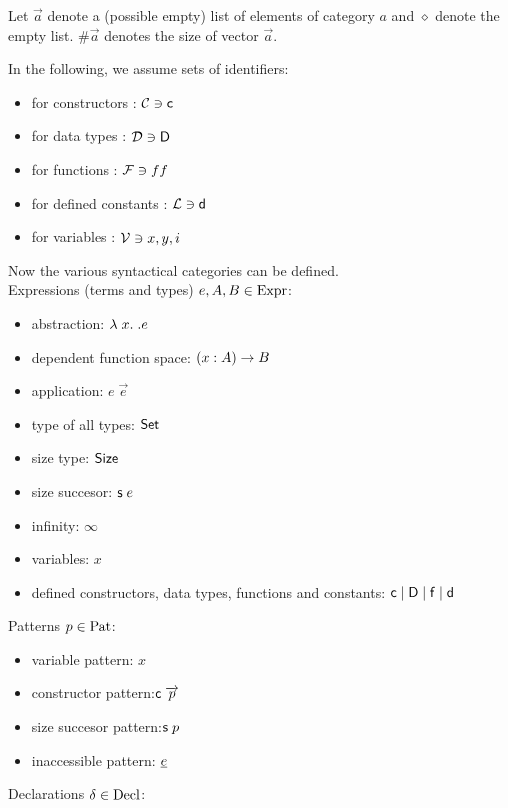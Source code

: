 Let $\vec{a}$ denote a (possible empty) list of elements of category $a$
and $\diamond$ denote the empty list. $\#\vec{a}$ denotes the size of vector $\vec{a}$.

In the following, we assume sets of identifiers:
\begin{itemize}
\item for constructors : $\mathcal{C} \ni \mathsf{c}$ 
\item for data types : $\mathcal{D} \ni \mathsf{D} $
\item for functions : $\mathcal{F} \ni ff$
\item for defined constants : $\mathcal{L} \ni \mathsf{d}$
\item for variables : $\mathcal{V} \ni x,y,i$
\end{itemize}
Now the various syntactical categories can be defined.
\\
Expressions (terms and types) $e,A,B \in \mathrm{Expr}$:  
\begin{itemize}
\item
abstraction: $ \lambda\; x .\; . e $ 
\item
dependent function space: $( x : A ) \rightarrow{B}$ 
\item 
application: $ e \; \vec{e} $ 
\item
type of all types: $ \mathsf{Set} $ 
\item
size type: $ \mathsf{Size} $ 
\item
size succesor: $\mathsf{s}\; e $ 
\item
infinity: $\infty$ 
\item
variables: $x$
\item
defined constructors, data types, functions and constants:
$ \mathsf{c} \;\vert\; \mathsf{D} \;\vert\; \mathsf{f} \;\vert\; \mathsf{d}$
\end{itemize}
Patterns $p \in \mathrm{Pat}$:
\begin{itemize}
\item
variable pattern: $x$ 
\item
constructor pattern:$ \mathsf{c} \; \overrightarrow{p} $ 
\item
size succesor pattern:$ \mathsf{s}\; p $ 
\item
inaccessible pattern: $ \underline{e} $ 
\end{itemize}
Declarations $\delta \in \mathrm{Decl}$:
